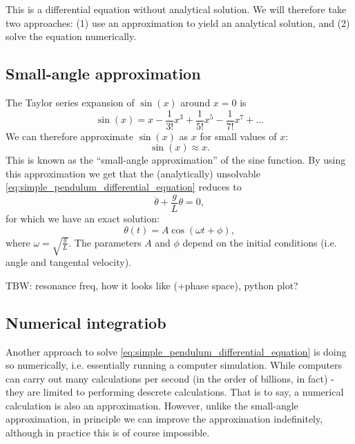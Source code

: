 This is a differential equation without analytical solution. We will therefore take two approaches: (1) use an approximation to yield an analytical solution, and (2) solve the equation numerically.

\subsection{Small-angle approximation}
The Taylor series expansion of $\sin(x)$ around $x=0$ is
\begin{equation}
	\sin(x) = x - \frac{1}{3!}x^{3} + \frac{1}{5!}x^{5} - \frac{1}{7!}x^{7} + \dots
	\label{eq:taylor_series_sin}
\end{equation}
We can therefore approximate $\sin(x)$ as $x$ for small values of $x$:
\begin{equation}
	\sin(x) \approx x.
	\label{eq:sin_small_angle_approx}
\end{equation}
This is known as the \enquote{small-angle approximation} of the sine function. By using this approximation we get that the (analytically) unsolvable \autoref{eq:simple_pendulum_differential_equation} reduces to
\begin{equation}
	\ddot{\theta} + \frac{g}{L}\theta = 0,
	\label{eq:simple_pendulum_small_angle_equation}
\end{equation}
for which we have an exact solution:
\begin{equation}
	\theta(t) = A\cos\left(\omega t+\phi\right),
	\label{eq:simple_pendulum_small_angle_solution}
\end{equation}
where $\omega=\sqrt{\frac{g}{L}}$. The parameters $A$ and $\phi$ depend on the initial conditions (i.e. angle and tangental velocity).

TBW: resonance freq, how it looks like (+phase space), python plot?

\subsection{Numerical integratiob}
Another approach to solve \autoref{eq:simple_pendulum_differential_equation} is doing so numerically, i.e. essentially running a computer simulation. While computers can carry out many calculations per second (in the order of billions, in fact) - they are limited to performing descrete calculations. That is to say, a numerical calculation is also an approximation. However, unlike the small-angle approximation, in principle we can improve the approximation indefinitely, although in practice this is of course impossible.

